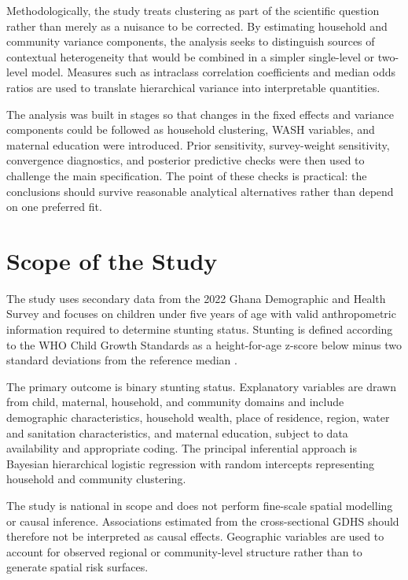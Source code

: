 Methodologically, the study treats clustering as part of the scientific question rather than merely as a nuisance to be corrected. By estimating household and community variance components, the analysis seeks to distinguish sources of contextual heterogeneity that would be combined in a simpler single-level or two-level model. Measures such as intraclass correlation coefficients and median odds ratios are used to translate hierarchical variance into interpretable quantities.

The analysis was built in stages so that changes in the fixed effects and variance components could be followed as household clustering, WASH variables, and maternal education were introduced. Prior sensitivity, survey-weight sensitivity, convergence diagnostics, and posterior predictive checks were then used to challenge the main specification. The point of these checks is practical: the conclusions should survive reasonable analytical alternatives rather than depend on one preferred fit.

\section{Scope of the Study}

The study uses secondary data from the 2022 Ghana Demographic and Health Survey and focuses on children under five years of age with valid anthropometric information required to determine stunting status. Stunting is defined according to the WHO Child Growth Standards as a height-for-age z-score below minus two standard deviations from the reference median \cite{WHOStunting2026}.

The primary outcome is binary stunting status. Explanatory variables are drawn from child, maternal, household, and community domains and include demographic characteristics, household wealth, place of residence, region, water and sanitation characteristics, and maternal education, subject to data availability and appropriate coding. The principal inferential approach is Bayesian hierarchical logistic regression with random intercepts representing household and community clustering.

The study is national in scope and does not perform fine-scale spatial modelling or causal inference. Associations estimated from the cross-sectional GDHS should therefore not be interpreted as causal effects. Geographic variables are used to account for observed regional or community-level structure rather than to generate spatial risk surfaces.

